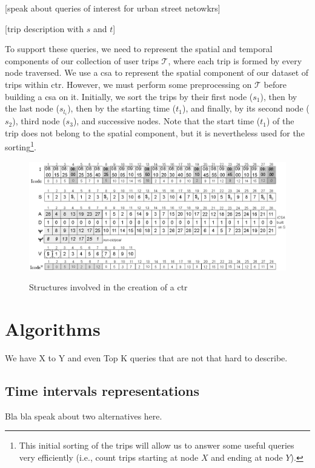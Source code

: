 \documentclass[a4paper,10pt,twoside]{book}
\begin{document}
	[speak about queries of interest for urban street netowkrs]
	
	[trip description with $s$ and $t$]
	
    To support these queries, we need to represent the spatial and temporal components of our collection of user trips $\mathcal{T}$, where each trip is formed by every node traversed. We use a \gls{csa} to represent the spatial component of our dataset of trips within \gls{ctr}. However, we must perform some preprocessing on $\mathcal{T}$ before building a \gls{csa} on it. Initially, we sort the trips by their first node ($s_1$), then by the last node ($s_{l_i}$), then by the starting time ($t_1$), and finally, by its second node ($s_2$), third node ($s_3$), and successive nodes. Note that the start time ($t_1$) of the trip does not belong to the spatial component, but it is nevertheless used for the sorting\footnote{This initial sorting of the trips will allow us to answer some useful queries very efficiently  (i.e., count trips starting at node $X$ and ending at node $Y$).}.
	
	\begin{figure}[h!]
      \begin{center}
      {\includegraphics[width=1.00\textwidth]{figures/csttr.eps}}
      \end{center}
      \caption{Structures involved in the creation of a \acrshort{ctr}}
      \label{fig:tcsa}
    \end{figure}
	
	\section{Algorithms}
	We have X to Y and even Top K queries that are not that hard to describe.
	
	\subsection{Time intervals representations}
	Bla bla speak about two alternatives here.
	
\end{document}
